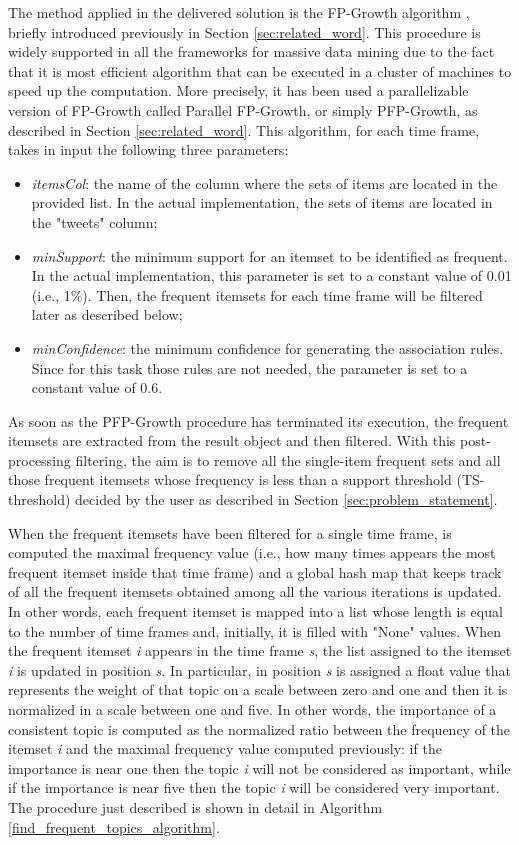 The method applied in the delivered solution is the FP-Growth algorithm \cite{fpgrowth-paper}, briefly introduced previously in Section \ref{sec:related_word}. This procedure is widely supported in all the frameworks for massive data mining due to the fact that it is most efficient algorithm that can be executed in a cluster of machines to speed up the computation. More precisely, it has been used a parallelizable version of FP-Growth called Parallel FP-Growth, or simply PFP-Growth, as described in Section \ref{sec:related_word}. This algorithm, for each time frame, takes in input the following three parameters:
\begin{itemize}
	\item \textit{itemsCol}: the name of the column where the sets of items are located in the provided list. In the actual implementation, the sets of items are located in the "tweets" column;
	\item \textit{minSupport}: the minimum support for an itemset to be identified as frequent. In the actual implementation, this parameter is set to a constant value of 0.01 (i.e., 1\%). Then, the frequent itemsets for each time frame will be filtered later as described below;
	\item \textit{minConfidence}: the minimum confidence for generating the association rules. Since for this task those rules are not needed, the parameter is set to a constant value of 0.6.
\end{itemize}

\noindent As soon as the PFP-Growth procedure has terminated its execution, the frequent itemsets are extracted from the result object and then filtered. With this post-processing filtering, the aim is to remove all the single-item frequent sets and all those frequent itemsets whose frequency is less than a support threshold (TS-threshold) decided by the user as described in Section \ref{sec:problem_statement}.

When the frequent itemsets have been filtered for a single time frame, is computed the maximal frequency value (i.e., how many times appears the most frequent itemset inside that time frame) and a global hash map that keeps track of all the frequent itemsets obtained among all the various iterations is updated. In other words, each frequent itemset is mapped into a list whose length is equal to the number of time frames and, initially, it is filled with "None" values. When the frequent itemset \textit{i} appears in the time frame \textit{s}, the list assigned to the itemset \textit{i} is updated in position \textit{s}. In particular, in position \textit{s} is assigned a float value that represents the weight of that topic on a scale between zero and one and then it is normalized in a scale between one and five. In other words, the importance of a consistent topic is computed as the normalized ratio between the frequency of the itemset \textit{i} and the maximal frequency value computed previously: if the importance is near one then the topic \textit{i} will not be considered as important, while if the importance is near five then the topic \textit{i} will be considered very important. The procedure just described is shown in detail in Algorithm \ref{find_frequent_topics_algorithm}.

